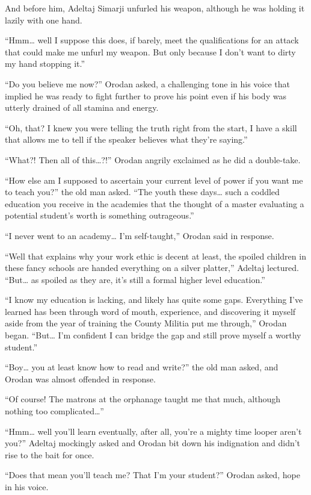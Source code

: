 \documentclass[a4paper,10pt]{book}
\begin{document}
And before him, Adeltaj Simarji unfurled his weapon, although he was holding it lazily with one hand.\par
“Hmm… well I suppose this does, if barely, meet the qualifications for an attack that could make me unfurl my weapon. But only because I don’t want to dirty my hand stopping it.”\par
“Do you believe me now?” Orodan asked, a challenging tone in his voice that implied he was ready to fight further to prove his point even if his body was utterly drained of all stamina and energy.\par
“Oh, that? I knew you were telling the truth right from the start, I have a skill that allows me to tell if the speaker believes what they’re saying.”\par
“What?! Then all of this…?!” Orodan angrily exclaimed as he did a double-take.\par
“How else am I supposed to ascertain your current level of power if you want me to teach you?” the old man asked. “The youth these days… such a coddled education you receive in the academies that the thought of a master evaluating a potential student’s worth is something outrageous.”\par
“I never went to an academy… I’m self-taught,” Orodan said in response.\par
“Well that explains why your work ethic is decent at least, the spoiled children in these fancy schools are handed everything on a silver platter,” Adeltaj lectured. “But… as spoiled as they are, it’s still a formal higher level education.”\par
“I know my education is lacking, and likely has quite some gaps. Everything I’ve learned has been through word of mouth, experience, and discovering it myself aside from the year of training the County Militia put me through,” Orodan began. “But… I’m confident I can bridge the gap and still prove myself a worthy student.”\par
“Boy… you at least know how to read and write?” the old man asked, and Orodan was almost offended in response.\par
“Of course! The matrons at the orphanage taught me that much, although nothing too complicated…”\par
“Hmm… well you’ll learn eventually, after all, you’re a mighty time looper aren’t you?” Adeltaj mockingly asked and Orodan bit down his indignation and didn’t rise to the bait for once.\par
“Does that mean you’ll teach me? That I’m your student?” Orodan asked, hope in his voice.\par
\end{document}
